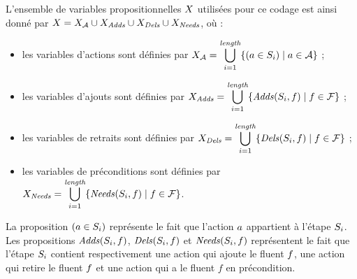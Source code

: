 L'ensemble de variables propositionnelles $X$ utilisées pour ce codage est ainsi donné par $X = X_{\mathcal{A}} \cup X_{\mathit{Adds}}\cup X_{\mathit{Dels}}\cup X_{\mathit{Needs}}$, où :
\begin{itemize}
    \item les variables d'actions sont définies par $\displaystyle X_{\mathcal{A}}=\bigcup_{i=1}^{\textit{length}}\{(a \in S_{i})\mid a\in\mathcal{A}\}$ ;
    \item les variables d'ajouts sont définies par $\displaystyle X_{\mathit{Adds}}=\bigcup_{i=1}^{\textit{length}}\{\mathit{Adds}(S_{i},f)\mid f\in\mathcal{F}\}$ ;
    \item les variables de retraits sont définies par $\displaystyle X_{\mathit{Dels}}=\bigcup_{i=1}^{\textit{length}}\{\mathit{Dels}(S_{i},f)\mid f\in\mathcal{F}\}$ ;
    \item les variables de préconditions sont définies par $\displaystyle X_{\mathit{Needs}}=\bigcup_{i=1}^{\textit{length}}\{\mathit{Needs}(S_{i},f)\mid f\in\mathcal{F}\}$.
\end{itemize}

La proposition $(a \in S_{i})$ représente le fait que l'action $a$ appartient à l'étape $S_{i}$. Les propositions $\mathit{Adds}(S_{i},f)$, $\mathit{Dels}(S_{i},f)$ et $\mathit{Needs}(S_{i},f)$ représentent le fait que l'étape $S_{i}$ contient respectivement une action qui ajoute le fluent $f$, une action qui retire le fluent $f$ et une action qui a le fluent $f$ en précondition.




